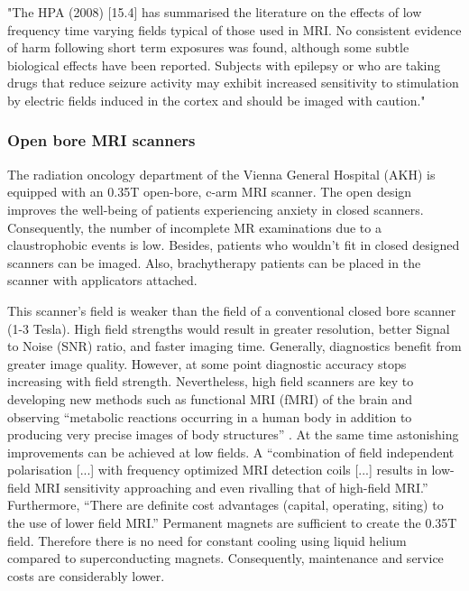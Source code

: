 "The HPA (2008) [15.4] has summarised the literature on the effects of
low frequency time varying fields typical of those used in MRI. No consistent
evidence of harm following short term exposures was found, although some subtle
biological effects have been reported. Subjects with epilepsy or who are taking
drugs that reduce seizure activity may exhibit increased sensitivity to stimulation
by electric fields induced in the cortex and should be imaged with caution."


\subsubsection{Open bore MRI scanners}
The radiation oncology department of the Vienna General Hospital (AKH) is equipped with an 0.35T open-bore, c-arm MRI scanner.
The open design improves the well-being of patients experiencing anxiety in closed scanners.
Consequently, the number of incomplete MR examinations due to a claustrophobic events is low. \cite{Enders2011a, Bangard2007}
Besides, patients who wouldn't fit in closed designed scanners can be imaged.
Also, brachytherapy patients can be placed in the scanner with applicators attached.

This scanner's field is weaker than the field of a conventional closed bore scanner (1-3 Tesla).
High field strengths would result in greater resolution, better Signal to Noise (SNR) ratio, and faster imaging time.
Generally, diagnostics benefit from greater image quality.
However, at some point diagnostic accuracy stops increasing with field strength.
Nevertheless, high field scanners are key to developing new methods such as functional MRI (fMRI) of the brain \cite{Duyn2012} and observing ``metabolic reactions occurring in a human body in addition to producing very precise images of body structures'' \cite{Wada2010}.
At the same time astonishing improvements can be achieved at low fields.
A ``combination of field independent polarisation [...] with frequency optimized MRI detection coils [...] results in low-field MRI sensitivity approaching and even rivalling that of high-field MRI.'' \cite{Coffey2013}
Furthermore, ``There are definite cost advantages (capital, operating, siting) to the use of lower field MRI.'' \cite{Rutt1996}
Permanent magnets are sufficient to create the 0.35T field.
Therefore there is no need for constant cooling using liquid helium compared to superconducting magnets.
Consequently, maintenance and service costs are considerably lower.



